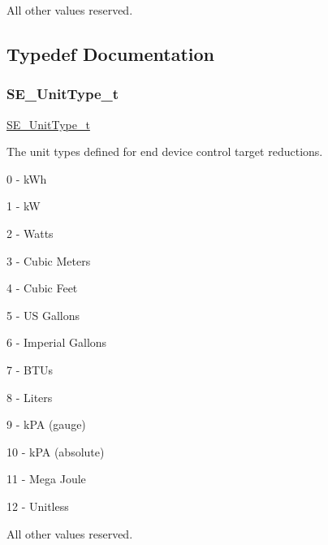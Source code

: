 All other values reserved. 

\subsection{Typedef Documentation}
\mbox{\label{group__UnitType_ga402dc1288733e4df30c6ae69e947cebe}} 
\subsubsection{\texorpdfstring{S\+E\+\_\+\+Unit\+Type\+\_\+t}{SE\_UnitType\_t}}
{\footnotesize\ttfamily \hyperlink{group__UnitType_ga402dc1288733e4df30c6ae69e947cebe}{S\+E\+\_\+\+Unit\+Type\+\_\+t}}

The unit types defined for end device control target reductions.

0 -\/ k\+Wh

1 -\/ kW

2 -\/ Watts

3 -\/ Cubic Meters

4 -\/ Cubic Feet

5 -\/ US Gallons

6 -\/ Imperial Gallons

7 -\/ B\+T\+Us

8 -\/ Liters

9 -\/ k\+PA (gauge)

10 -\/ k\+PA (absolute)

11 -\/ Mega Joule

12 -\/ Unitless

All other values reserved. 